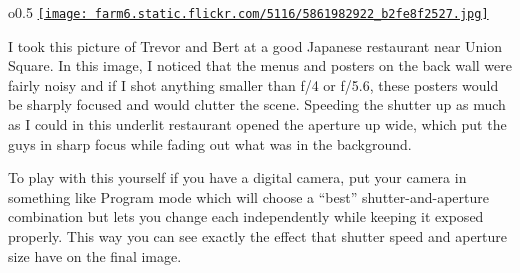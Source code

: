 \begin{wrapfigure}{o}{0.5\linewidth}
\href{http://www.flickr.com/photos/nolancaudill/5861982922/}{\texttt{[image: farm6.static.flickr.com/5116/5861982922\_b2fe8f2527.jpg]}}
\end{wrapfigure}

I took this picture of Trevor and Bert at a good Japanese restaurant
near Union Square. In this image, I noticed that the menus and posters
on the back wall were fairly noisy and if I shot anything smaller than
f/4 or f/5.6, these posters would be sharply focused and would clutter
the scene. Speeding the shutter up as much as I could in this underlit
restaurant opened the aperture up wide, which put the guys in sharp
focus while fading out what was in the background.


To play with this yourself if you have a digital camera, put your camera
in something like Program mode which will choose a ``best''
shutter-and-aperture combination but lets you change each independently
while keeping it exposed properly. This way you can see exactly the
effect that shutter speed and aperture size have on the final image.
